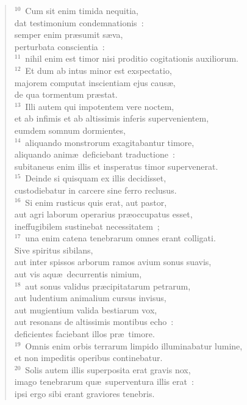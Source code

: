 \begin{verse}
${}^{10}$~Cum sit enim timida nequitia,\\ dat testimonium condemnationis~:\\ semper enim pr\ae sumit s\ae va,\\ perturbata conscientia~:\\
${}^{11}$~nihil enim est timor nisi proditio cogitationis auxiliorum.\\
${}^{12}$~Et dum ab intus minor est exspectatio,\\ majorem computat inscientiam ejus caus\ae ,\\ de qua tormentum pr\ae stat.\\
${}^{13}$~Illi autem qui impotentem vere noctem,\\ et ab infimis et ab altissimis inferis supervenientem,\\ eumdem somnum dormientes,\\
${}^{14}$~aliquando monstrorum exagitabantur timore,\\ aliquando anim\ae\ deficiebant traductione~:\\ subitaneus enim illis et insperatus timor supervenerat.\\
${}^{15}$~Deinde si quisquam ex illis decidisset,\\ custodiebatur in carcere sine ferro reclusus.\\
${}^{16}$~Si enim rusticus quis erat, aut pastor,\\ aut agri laborum operarius pr\ae occupatus esset,\\ ineffugibilem sustinebat necessitatem~;\\
${}^{17}$~una enim catena tenebrarum omnes erant colligati.\\ Sive spiritus sibilans,\\ aut inter spissos arborum ramos avium sonus suavis,\\ aut vis aqu\ae\ decurrentis nimium,\\
${}^{18}$~aut sonus validus pr\ae cipitatarum petrarum,\\ aut ludentium animalium cursus invisus,\\ aut mugientium valida bestiarum vox,\\ aut resonans de altissimis montibus echo~:\\ deficientes faciebant illos pr\ae\ timore.\\
${}^{19}$~Omnis enim orbis terrarum limpido illuminabatur lumine,\\ et non impeditis operibus continebatur.\\
${}^{20}$~Solis autem illis superposita erat gravis nox,\\ imago tenebrarum qu\ae\ superventura illis erat~:\\ ipsi ergo sibi erant graviores tenebris.\end{verse}


